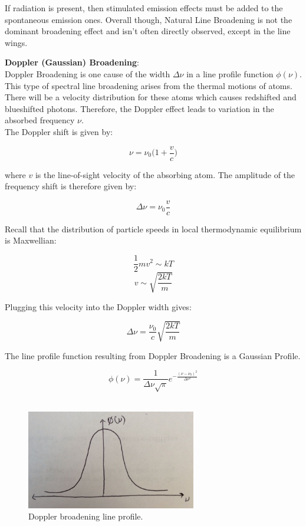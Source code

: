 \documentclass{article}
\begin{document}
If radiation is present, then stimulated emission effects must be added to the spontaneous emission ones. Overall though, Natural Line Broadening is not the dominant broadening effect and isn't often directly observed, except in the line wings.

\textbf{Doppler (Gaussian) Broadening}:\\

Doppler Broadening is one cause of the width $\Delta\nu$ in a line profile function $\phi(\nu)$. This type of spectral line broadening arises from the thermal motions of atoms. There will be a velocity distribution for these atoms which causes redshifted and blueshifted photons. Therefore, the Doppler effect leads to variation in the absorbed frequency $\nu$. \\

The Doppler shift is given by: 

$$\nu = \nu_{0}\bigg(1+{\frac{v}{c}}\bigg)$$

where $v$ is the line-of-sight velocity of the absorbing atom. The amplitude of the frequency shift is therefore given by: 

$$\Delta \nu = \nu_{0}{\frac{v}{c}}$$

Recall that the distribution of particle speeds in local thermodynamic equilibrium is Maxwellian:

$${\frac{1}{2}}mv^{2} \sim kT $$
$$v \sim \sqrt{{\frac{2kT}{m}}} $$

Plugging this velocity into the Doppler width gives:

$$\Delta \nu = {\frac{\nu_{0}}{c}}\sqrt{{\frac{2kT}{m}}} $$

The line profile function resulting from Doppler Broadening is a Gaussian Profile. 

$$\phi(\nu) = {\frac{1}{\Delta\nu\sqrt{\pi}}}e^{-{\frac{(\nu-\nu_{0})^{2}}{\Delta\nu^{2}}}} $$ \\

\begin{figure}[ht]
    \centering
    \includegraphics[width=0.66\textwidth]{doppler.jpg}
    \caption{Doppler broadening line profile.}
    \label{fig:dopp}
\end{figure}
\end{document}
